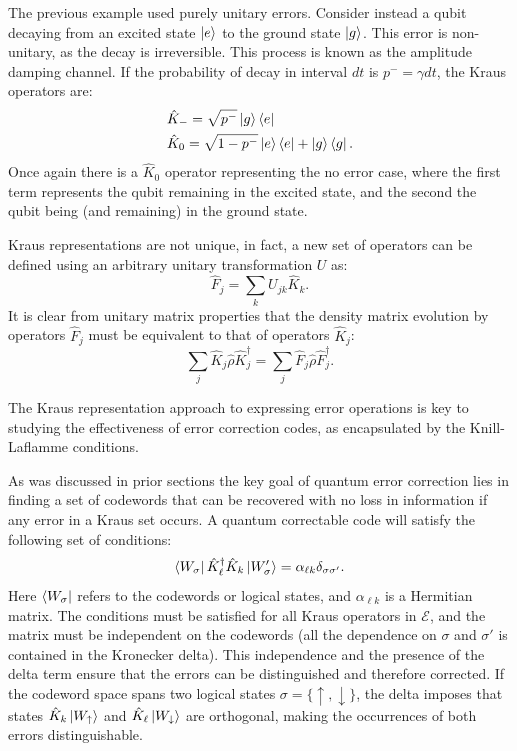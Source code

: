 The previous example used purely unitary errors. Consider instead a qubit decaying from an excited state $\ket{e}$ to the ground state $\ket{g}$. This error is non-unitary, as the decay is irreversible. This process is known as the amplitude damping channel. If the probability of decay in interval $dt$ is $p^-=\gamma dt$, the Kraus operators are:
\begin{eqnarray}
    &\hat K_- = \sqrt{p^-} \ket{g}\bra{e}\\
     &\hat K_0= \sqrt{1-p^-} \ket{e}\bra{e}+\ket{g}\bra{g}.
\end{eqnarray}
Once again there is a $\hat K_0$ operator representing the no error case, where the first term represents the qubit remaining in the excited state, and the second the qubit being (and remaining) in the ground state.

Kraus representations are not unique, in fact, a new set of operators can be defined using an arbitrary unitary transformation $U$ as:
\begin{equation}
    \hat F_j = \sum_k U_{jk}\hat K_k.
\end{equation}
It is clear from unitary matrix properties that the density matrix evolution by operators $\hat F_j$ must be equivalent to that of operators $\hat K_j$:
\begin{equation}
    \sum_j\hat K_j\hat\rho\hat K_j^\dagger = \sum_j\hat F_j\hat\rho\hat F_j^\dagger.
\end{equation}

The Kraus representation approach to expressing error operations is key to studying the effectiveness of error correction codes, as encapsulated by the Knill-Laflamme conditions.

As was discussed in prior sections the key goal of quantum error correction lies in finding a set of codewords that can be recovered with no loss in information if any error in a Kraus set occurs. A quantum correctable code will satisfy the following set of conditions:
\begin{equation}
    \bra{W_\sigma}  \hat K_\ell^\dagger\hat K_k \ket{W_\sigma'}= \alpha_{\ell k}\delta_{\sigma\sigma'}.
\end{equation}
Here $\bra{W_\sigma}$ refers to the codewords or logical states, and $\alpha_{\ell k}$ is a Hermitian matrix. The conditions must be satisfied for all Kraus operators in $\mathcal{E}$, and the matrix must be independent on the codewords (all the dependence on $\sigma$ and $\sigma'$ is contained in the Kronecker delta). This independence and the presence of the delta term ensure that the errors can be distinguished and therefore corrected. If the codeword space spans two logical states $\sigma=\{\uparrow,\downarrow\}$, the delta imposes that states $\hat K_k\ket{W_\uparrow}$ and $\hat K_\ell\ket{W_\downarrow}$ are orthogonal, making the occurrences of both errors distinguishable.

